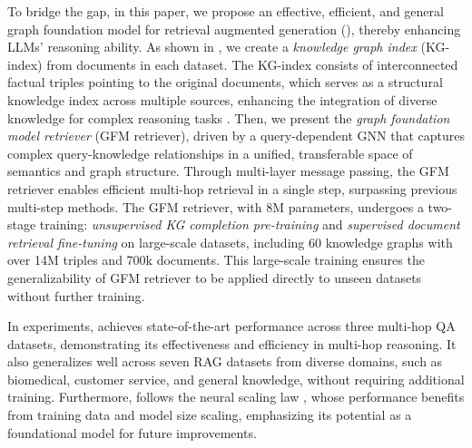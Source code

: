 To bridge the gap, in this paper, we propose an effective, efficient, and general graph foundation model for retrieval augmented generation (\ourmethod), thereby enhancing LLMs' reasoning ability.
%
As shown in , we create a \emph{knowledge graph index} (KG-index) from documents in each dataset. The KG-index consists of interconnected factual triples pointing to the original documents, which serves as a structural knowledge index across multiple sources, enhancing the integration of diverse knowledge for complex reasoning tasks \cite{gutiérrez2024hipporag}. 
%
Then, we present the \emph{graph foundation model retriever} (GFM retriever), driven by a query-dependent GNN that captures complex query-knowledge relationships in a unified,  transferable space of semantics and graph structure. Through multi-layer message passing, the GFM retriever enables efficient multi-hop retrieval in a single step, surpassing previous multi-step methods.
%
The GFM retriever, with 8M parameters, undergoes a two-stage training: \emph{unsupervised KG completion pre-training} and \emph{supervised document retrieval fine-tuning} on large-scale datasets, including 60 knowledge graphs with over 14M triples and 700k documents. This large-scale training ensures the generalizability of GFM retriever to be applied directly to unseen datasets without further training.

In experiments, \ourmethod achieves state-of-the-art performance across three multi-hop QA datasets, demonstrating its effectiveness and efficiency in multi-hop reasoning. It also generalizes well across seven RAG datasets from diverse domains, such as biomedical, customer service, and general knowledge, without requiring additional training. Furthermore, \ourmethod follows the neural scaling law \cite{hestness2017deep}, whose performance benefits from training data and model size scaling, emphasizing its potential as a foundational model for future improvements.

